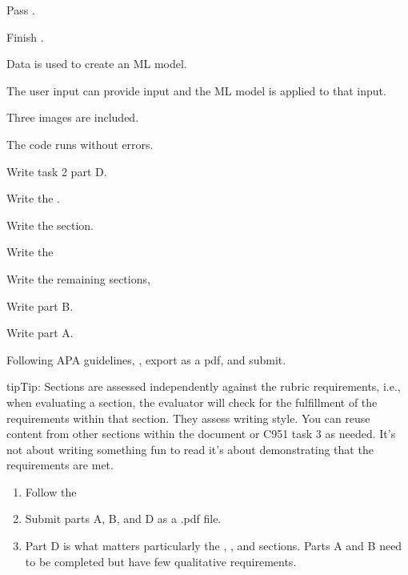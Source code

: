 \documentclass[letterpaper,10pt,english]{jupyterBook}
\begin{document}
\sphinxAtStartPar
 Pass {\hyperref[\detokenize{task1:task1}]{}}.

\sphinxAtStartPar
 Finish .



\sphinxAtStartPar
 Data is used to create an ML model.

\sphinxAtStartPar
 The user input can provide input and the ML model is applied to that input.

\sphinxAtStartPar
 Three images are included.

\sphinxAtStartPar
 The code runs without errors.



\sphinxAtStartPar
 Write task 2 part D.



\sphinxAtStartPar
 Write the .

\sphinxAtStartPar
 Write the  section.

\sphinxAtStartPar
 Write the 

\sphinxAtStartPar
 Write the remaining  sections,



\sphinxAtStartPar
 Write part B.

\sphinxAtStartPar
 Write part A.

\sphinxAtStartPar
 Following APA guidelines, , export as a  pdf, and submit.



\begin{sphinxadmonition}{tip}{Tip:}
\sphinxAtStartPar
Sections are assessed independently against the rubric requirements, i.e., when evaluating a section, the evaluator will check for the fulfillment of the requirements within that section. They  assess writing style. You can reuse content from other sections within the document or C951 task 3 as needed. It’s not about writing something fun to read \sphinxhyphen{}it’s about demonstrating that the requirements are met.
\begin{enumerate}
%
\item {} 
\sphinxAtStartPar
Follow the 

\item {} 
\sphinxAtStartPar
Submit parts A, B, and D as a  .pdf file.

\item {} 
\sphinxAtStartPar
Part D is what matters \sphinxhyphen{}particularly the , , and  sections. Parts A and B need to be completed but have few qualitative requirements.

\end{enumerate}
\end{sphinxadmonition}
\end{document}
